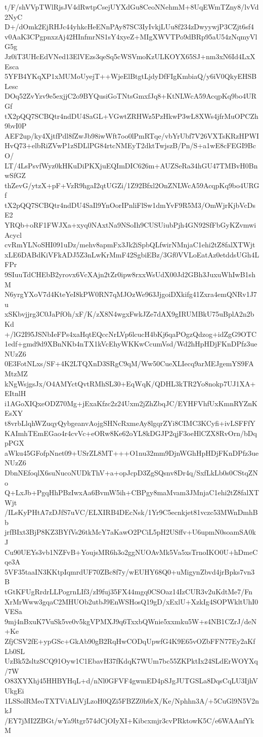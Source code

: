 t/F/shVVpTWlRjsJV4dRwtpCsejUYXdGu8CeoNNehmM+8UqEWmTZny8/lvVd2NyC
D+/dOmk2EjRHJc44yhkcHeENnPAy87SC3IyIvkjLUu8f234zDwyywjP3CZjt6sf4
v0AaK3CPgpnxzAj42HInfmrNS1sY4xyeZ+MIgXWVTPo9dBRp95aU54zNqmyVlG5g
Jz0iT3UHcEdVNed13ElVEzs3qeSq5cWSVmoKzULKOYX65SJ+nm3xN6Id4LxXEsca
5YFB4YKqXP1xMUMoUyejT++WjeElBtgtLjdyDfFIgKmbiaQ/y6iV0QkyEHSBLesc
DOq52ZvYzv9e5exjjC2o9BYQusiGoTNtsGmxfJq8+KtNLWcA59AcqpKq9bo4URGf
tX2pQQ7SCBQtr4ndDU4SaGL+VGwtZRHWz5PzHkwP3wL8XWs4jfrMuOPCZh9bvI0P
AEF2up/ky4XjtfPdl8fZwJb98iwWft7oo0lPmRTqe/vbYrUbf7V26VXTsKRzHPWI
HvQ73+elbRiZVwP1zSDLlPG84rtcNMEyT2dktTwjszB/Pn/S+a1wE8cFEGI9BcO/
LT/4LsPsvfWyz0kHKuDiPKXjuEQImDIC626m+AUZSeRa34hGU47TMBvH0BnwSfGZ
thZevG/ytzX+pF+VzR9hgaI2qtUGZi/1Z92Bfxl2OnZNLWcA59AcqpKq9bo4URGf
tX2pQQ7SCBQtr4ndDU4SaIl9YnOorIPnliFlSw1dmYvF9R5M3/OmWjrKjbVcDsE2
YRQb+oRF1FWJXa+xyq0NAxtNa9NSoIh9CUSUiubPjh4GN92SfFbGyKZvmwiAcycl
cvRmYLNoSHI091uDz/mehv8apmFx3Jk2iSpbQLfwirNMnjaC1ehi2tZ8falXTWjt
xLE6DABdKiVFkADJ5Z3nLwKrMmF42SgbiEBz/3Gf0VVLoEatAz0etddsUGh4LFPr
9SIuuTdCHEbB2yrovx6VcXAjn2tZr0ipw8rxxWsUdX00Jd2GBh3JuxuWhIwB1shM
N6yrgYXoV7d4KteYeI8kPW0RN7qMJOzWe963JjgoiDXkifg41Zxra4emQNRv1J7u
xSKbvjjrg3C0JaPfOh/xF/K/zX8N4wgxFwkJZe7dAX9gIRUMBkU75uBplA2n2bKd
+/lG2I95JSNbIeFPs4xaHqtEQccNrLVp6lcucH4bKj6qaPOgzQdzog+idZgG9OTC
1edf+gmd9d9XBnNKb4nTX1kVcEhyWKKwCcumVsd/Wd2hHpHDjFKnDPfz3ueNUzZ6
0E3FotNLxs/SF+4K2LTQXnD3SRgC9qM/Ww50CueXLIecq9arMEJgemYS9FAMtzMZ
kNgWsjgsJx/O4AMYctQvtRMhSL30+EqWqK/QDHL3kTR2Yo8nokp7UJ1XA+EItnlH
i1AGoXIQxeODZ70Mg+jExaKfzc2z24Uxm2jZhZbqJC/EYHFVhfUxKmnRYZnKEsXY
t8vrbLlqhWZuqyQybgeanvAojgSHNcRxmeAy8lgqrZYi8CIMC3KCyfi+ivLSFFfY
KAImhTEmEGao4r4cvVc+eORw8Ke62oYL8kDGJP2qjF3oeHlCZX8RvOrn/bDqpPGX
aWku45GFofpNnet09+USrZL8MT+++O1nu32mm9DjnWGhHpHDjFKnDPfz3ueNUzZ6
DbnNEfoqlX6suNucoNUDkThV+a+opJcpD3ZgSQsnv8Dr4q/SxfLkLb0s0CStqZNo
Q+LxJb+PgqHhPBzIwxAa6BvmW5ih+CBPgy8maMvam3JMnjaC1ehi2tZ8falXTWjt
/ILsKyPHtA7zDJfS7uVC/ELXIRB4DEcNsk/1Yr9C5ecnkjet81vczc53MWnDmhBb
jrfBIxt3BjP8KZ3BYfVs26tkMcY7aKawO2PCiL5pH2USffv+U6upmN0soamSA0kJ
Cu90UEYs3vb1NZFvB+YoujsMR6h3o2ggNUOAvMk5Va5xsTrnoIKO0U+hDmeCqe3A
5VF35taaIN3KKtpIqmrdUF70ZBc8f7y/wEUHY68Q0+uMigynZbvd4jrBpks7vn3B
tGtKFUgRrdrLLPogrnLIf3/zI9fuj35FX44mgq0CSOaz14IzCUR3v2uKdtMe7/Fn
XrMrWww3gqaC2MHUOb2utbJ9EnWSHosQ19gD/xExlU+XzkIg4SOPWkltUhI0VESa
9mj4nBxuK7VuSk5ve0v5kgVPMXJ9q6TxxbQWnie5xxmku5W+s4NB1CZrJ/deN+Ke
ZfjCSV2fE+ypGSc+GkAb90gB2RqHwCODqUpwfG4K9E65vOZbFFN77Ey2aKfLb0SL
UzBk52sltzSCQ91Oyw1C1EbavH37fKdqK7WUm7bc55ZKPktIx24SLdErWOYXq/7W
O83XYXhj45HHBYHqL+d/nNl0GFVF4gwmED4pSJgJUTGSLa8DqsCqLU3IjhVUkgEi
1LSSolRMeoTXTViALlVjLzoH0QZi5FBZZ0h6rX/Ke/Nphhn3A/+5CuGl9N5V2nkJ
/EY7jMI2ZBGt/wYa9ltgr574dCjOIyXI+Kibcxmjr3cvPRktowK5C/e6WAAnfYkM
